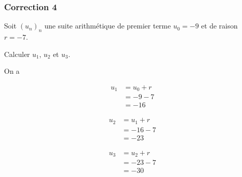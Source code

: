 \documentclass[15pt, mathserif]{beamer}
\begin{document}
\begin{frame}
\vspace{-10mm}
	\frametitle{Correction 4}
Soit $(u_n)_n$ une suite arithmétique de premier terme $u_0=-9$ et de raison $r=-7$. 
 
 Calculer $u_1$, $u_2$ et $u_3$. 
 
 On a 
 \begin{minipage}{0.25\textwidth} 
 
 \begin{align*} 
 u_1 &= u_0+r \\ &= -9-7 \\ &=-16
 \end{align*} 
  
 \end{minipage} \hfil \begin{minipage}{0.25\textwidth} 
 
 \begin{align*} 
 u_2 &= u_1+r \\ &= -16-7 \\ &=-23
 \end{align*} 
 
 \end{minipage} \hfil \begin{minipage}{0.25\textwidth} 
 
 \begin{align*} 
 u_3 &= u_2+r \\ &= -23-7 \\ &=-30
 \end{align*} 
 
 \end{minipage} 
\end{frame}
\end{document}
